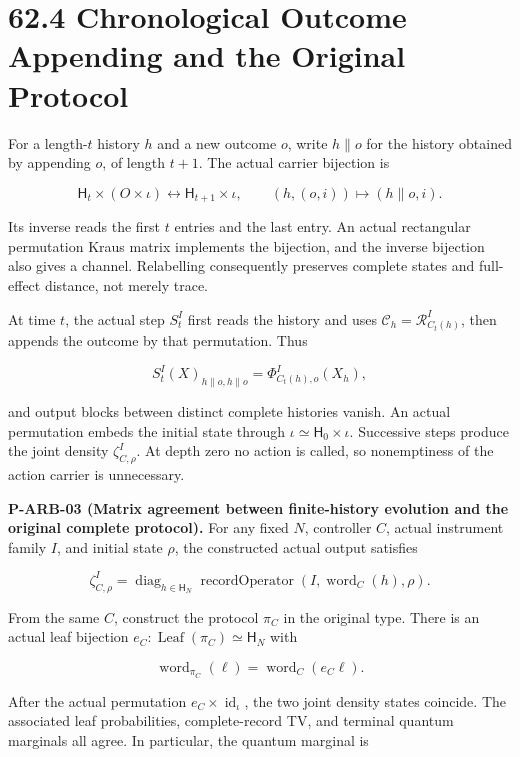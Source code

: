 \documentclass[
  11pt,
  oneside]{book}
\begin{document}
\section{62.4 Chronological Outcome Appending and the Original Protocol}

For a length-\(t\) history \(h\) and a new outcome \(o\), write
\(h\mathbin{\|}o\) for the history obtained by appending \(o\), of
length \(t+1\). The actual carrier bijection is

\[
\mathsf H_t\times(O\times\iota)
\longleftrightarrow\mathsf H_{t+1}\times\iota,
\qquad(h,(o,i))\longmapsto(h\mathbin{\|}o,i).
\]

Its inverse reads the first \(t\) entries and the last entry. An actual
rectangular permutation Kraus matrix implements the bijection, and the
inverse bijection also gives a channel. Relabelling consequently
preserves complete states and full-effect distance, not merely trace.

At time \(t\), the actual step \(S^I_t\) first reads the history and
uses \(\mathcal C_h=\mathcal R^I_{C_t(h)}\), then appends the outcome by
that permutation. Thus

\[
S^I_t(X)_{h\|o,h\|o}
=\Phi^I_{C_t(h),o}(X_h),
\]

and output blocks between distinct complete histories vanish. An actual
permutation embeds the initial state through
\(\iota\simeq\mathsf H_0\times\iota\). Successive steps produce the
joint density \(\zeta^I_{C,\rho}\). At depth zero no action is called,
so nonemptiness of the action carrier is unnecessary.

\label{p-arb-03}{}

\textbf{P-ARB-03 (Matrix agreement between finite-history evolution and
the original complete protocol).} For any fixed \(N\), controller \(C\),
actual instrument family \(I\), and initial state \(\rho\), the
constructed actual output satisfies

\[
\zeta^I_{C,\rho}
=\operatorname{diag}_{h\in\mathsf H_N}
 \operatorname{recordOperator}(I,\operatorname{word}_C(h),\rho).
\]

From the same \(C\), construct the protocol \(\pi_C\) in the original
type. There is an actual leaf bijection
\(e_C:\operatorname{Leaf}(\pi_C)\simeq\mathsf H_N\) with

\[
\operatorname{word}_{\pi_C}(\ell)
=\operatorname{word}_C(e_C\ell).
\]

After the actual permutation \(e_C\times\operatorname{id}_\iota\), the
two joint density states coincide. The associated leaf probabilities,
complete-record TV, and terminal quantum marginals all agree. In
particular, the quantum marginal is
\end{document}
